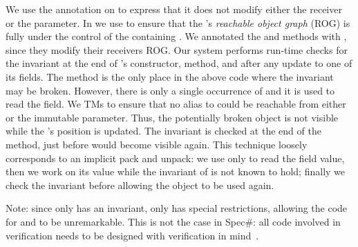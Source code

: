 We use the \Q@read@ annotation on \Q@equals@ to express that it does not modify either the
receiver or the parameter. In \Q@Cage@ we use 
 to ensure
that the \Q@Hamster@'s \emph{reachable object graph} (ROG) is fully under the control
of the containing \Q@Cage@. 
We annotated the \Q@move@
and \Q@moveTo@ methods with \Q@mut@, since they modify
their receivers ROG. 
Our system performs run-time checks for the invariant
at the end of \Q@Cage@'s constructor, \Q@moveTo@ method, and after any update to one of its fields.
The \Q@moveTo@ method is the only place in the above code where the invariant may be broken. However, there is only a single occurrence of \Q@this@ and it is used to read the \Q@h@ field. We  TMs to ensure that no alias to \Q@this@ could be reachable from either \Q@h@ or the immutable \Q@Point@ parameter. Thus, the potentially broken \Q@this@ object is not visible while the \Q@Hamster@'s position is updated. 
The invariant is checked at the end of the \Q@moveTo@ method, just before \Q@this@ would become visible again.
This technique loosely corresponds to an implicit pack and unpack: we use \Q@this@ only to read the field value, then we work on its value while the invariant of \Q@this@ is not known to hold; finally we check the invariant before allowing the object to  be used again.

Note: since only \Q@Cage@ has an invariant,
 only \Q@Cage@ has special restrictions, allowing the code for \Q@Point@ and \Q@Hamster@ to be unremarkable.
 This is not the case in Spec\#: all code involved in  verification needs to be designed with verification in mind~\cite{barnett2011specification}.

